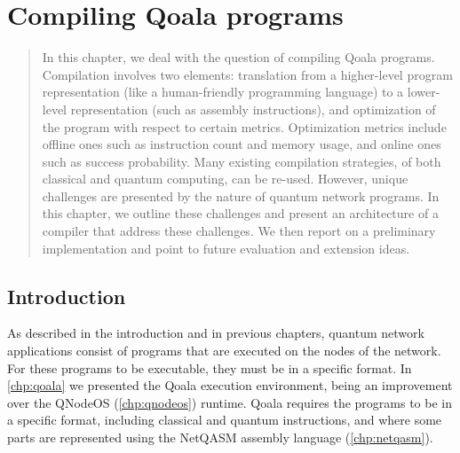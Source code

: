 \chapter
 [Compiling Qoala programs]
 {Compiling Qoala programs}
\label{chp:compiler}


\begin{abstract}
In this chapter, we deal with the question of compiling Qoala programs.
Compilation involves two elements: translation from a higher-level program representation (like a human-friendly programming language) to 
a lower-level representation (such as assembly instructions), and optimization of the program with respect to certain metrics.
Optimization metrics include offline ones such as instruction count and memory usage, and online ones such as success probability.
Many existing compilation strategies, of both classical and quantum computing, can be re-used.
However, unique challenges are presented by the nature of quantum network programs.
In this chapter, we outline these challenges and present an architecture of a compiler that address these challenges.
We then report on a preliminary implementation and point to future evaluation and extension ideas.
\end{abstract}

\section{Introduction}
As described in the introduction and in previous chapters, quantum network applications consist of programs that are executed on the nodes of the network.
For these programs to be executable, they must be in a specific format.
In \cref{chp:qoala} we presented the Qoala execution environment, being an improvement over the QNodeOS (\cref{chp:qnodeos}) runtime.
Qoala requires the programs to be in a specific format, including classical and quantum instructions, and where some parts are represented using the NetQASM assembly language (\cref{chp:netqasm}).

